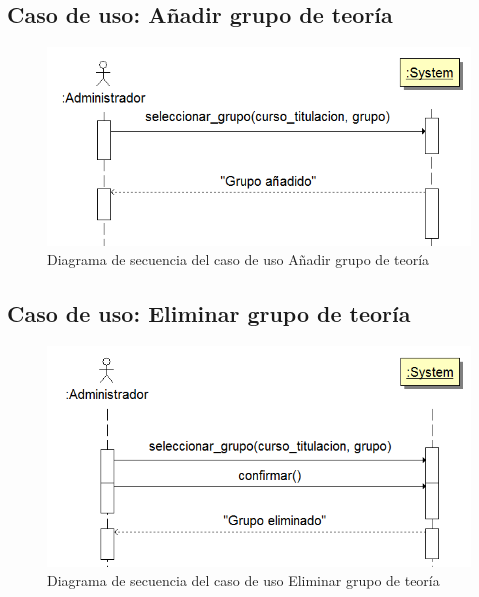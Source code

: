 \documentclass{book}
\begin{document}
\subsection{Caso de uso: Añadir grupo de teoría}
\begin{figure}[H] 
  \label{comportamiento-anadir-grupos} 
	\begin{center}
    \includegraphics[scale=0.5]{./secuencia-anadir-grupo.png}
  \end{center}
\caption{Diagrama de secuencia del caso de uso Añadir grupo de teoría}
\end{figure}

\subsection{Caso de uso: Eliminar grupo de teoría}
\begin{figure}[H] 
  \label{comportamiento-borrar-grupos} 
	\begin{center}
    \includegraphics[scale=0.5]{./secuencia-borrar-grupo.png}
  \end{center}
\caption{Diagrama de secuencia del caso de uso Eliminar grupo de teoría}
\end{figure}
\end{document}
